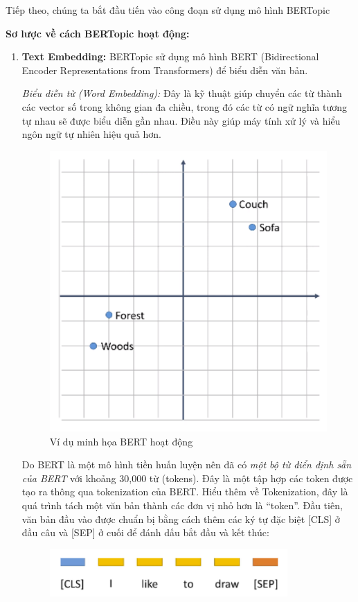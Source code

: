 Tiếp theo, chúng ta bắt đầu tiến vào công đoạn sử dụng mô hình BERTopic

\textbf{Sơ lược về cách BERTopic hoạt động:}

\begin{enumerate}
    \item \textbf{Text Embedding:} BERTopic sử dụng mô hình BERT  (Bidirectional Encoder Representations from Transformers) để biểu diễn văn bản.
    
    \textit{Biểu diễn từ (Word Embedding):} Đây là kỹ thuật giúp chuyển các từ thành các vector số trong không gian đa chiều, trong đó các từ có ngữ nghĩa tương tự nhau sẽ được biểu diễn gần nhau. Điều này giúp máy tính xử lý và hiểu ngôn ngữ tự nhiên hiệu quả hơn.

     \begin{figure}[H]
        \centering
        \includegraphics[width=0.6\linewidth]{Figures/8.12.png}
        \caption{Ví dụ minh họa BERT hoạt động}
        \label{fig:enter-label}
    \end{figure}

    Do BERT là một mô hình tiền huấn luyện nên đã có \textit{một bộ từ điển định sẵn của BERT} với khoảng 30,000 từ (tokens). Đây là một tập hợp các token được tạo ra thông qua tokenization của BERT. Hiểu thêm về Tokenization, đây là quá trình tách một văn bản thành các đơn vị nhỏ hơn là “token”. Đầu tiên, văn bản đầu vào được chuẩn bị bằng cách thêm các ký tự đặc biệt [CLS] ở đầu câu và [SEP] ở cuối để đánh dấu bắt đầu và kết thúc:

     \begin{figure}[H]
        \centering
        \includegraphics[width=0.4\linewidth]{Figures/8.13.png}
        \label{fig:enter-label}
    \end{figure}


\end{enumerate}
